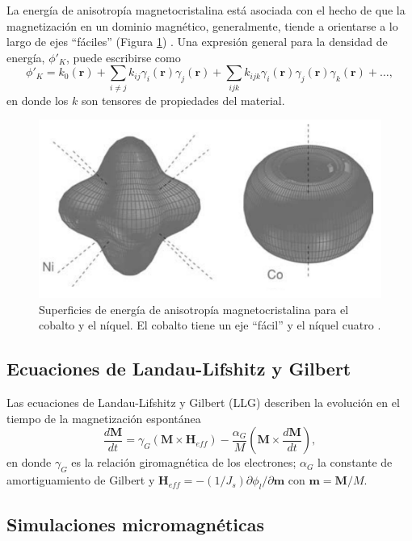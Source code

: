 La energía de anisotropía magnetocristalina está asociada con el hecho de que la magnetización en un dominio magnético, generalmente, tiende a orientarse a lo largo de ejes ``fáciles'' (Figura \ref{fig:Anisotropy}) \cite{coey_2010}. Una expresión general para la densidad de energía, $\phi'_K$, puede escribirse como \cite{birss1964symmetry} \[ \phi'_K = k_0 (\bm{r}) + \sum_{i \neq j} k_{ij} \gamma_i (\bm{r}) \gamma_j(\bm{r}) + \sum_{ijk} k_{ijk} \gamma_i (\bm{r}) \gamma_j (\bm{r}) \gamma_k (\bm{r}) + \dotsc,  \] en donde los $k$ son tensores de propiedades del material.
\begin{figure}[!hpt]
    \centering
    \includegraphics[scale=0.55]{Figuras/Anisotropy.png}
    \renewcommand{\figurename}{\textbf{Figura}}
    \renewcommand\thefigure{\textbf{\arabic{figure}}}
    \caption{Superficies de energía de anisotropía magnetocristalina para el cobalto y el níquel. El cobalto tiene un eje ``fácil'' y el níquel cuatro \cite{coey_2010}.}
    \label{fig:Anisotropy}
\end{figure}
\subsection{Ecuaciones de Landau-Lifshitz y Gilbert}
Las ecuaciones de Landau-Lifshitz y Gilbert (LLG) describen la evolución en el tiempo de la magnetización espontánea \cite{Exl2020} \[ \frac{d \bm{M}}{dt} = \gamma_G (\bm{M} \times \bm{H}_{eff}) - \frac{\alpha_G}{M}(\bm{M} \times \frac{d \bm{M}}{dt}),\] en donde $\gamma_G$ es la relación giromagnética de los electrones; $\alpha_G$ la constante de amortiguamiento de Gilbert y $\bm{H}_{eff} = - (1/J_s) \partial \phi_l / \partial \bm{m}$ con $\bm{m} = \bm{M}/M$. 
\subsection{Simulaciones micromagnéticas}
